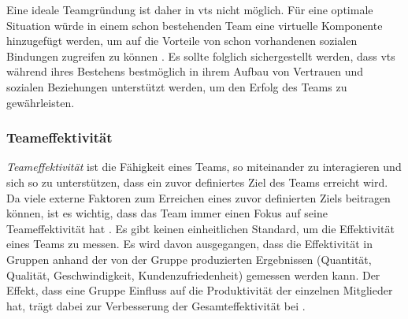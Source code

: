 \documentclass[a4paper,11pt]{article}%
\renewcommand{\\}{\vspace*{0.5\baselineskip} \newline}
\begin{document}
Eine ideale Teamgründung ist daher in \ac{vts} nicht möglich. 
Für eine optimale Situation würde in einem schon bestehenden Team eine virtuelle Komponente hinzugefügt werden, um auf die Vorteile von schon vorhandenen sozialen Bindungen zugreifen zu können \citep[p.36-37]{holton2001building}.
Es sollte folglich sichergestellt werden, dass \ac{vts} während ihres Bestehens bestmöglich in ihrem Aufbau von Vertrauen und sozialen Beziehungen unterstützt werden, um den Erfolg des Teams zu gewährleisten.
		\subsubsection{Teameffektivität}
\label{Teameffektivität}
\textit{Teameffektivität} ist die Fähigkeit eines Teams, so miteinander zu interagieren und sich so zu unterstützen, dass ein zuvor definiertes Ziel des Teams erreicht wird. Da viele externe Faktoren zum Erreichen eines zuvor definierten Ziels beitragen können, ist es wichtig, dass das Team immer einen Fokus auf seine Teameffektivität hat \citep[p.557]{salas2005there}.
	Es gibt keinen einheitlichen Standard, um die Effektivität eines Teams zu messen. Es wird davon ausgegangen, dass die Effektivität in Gruppen anhand der von der Gruppe produzierten Ergebnissen (Quantität, Qualität, Geschwindigkeit, Kundenzufriedenheit) gemessen werden kann. Der Effekt, dass eine Gruppe Einfluss auf die Produktivität der einzelnen Mitglieder hat, trägt dabei zur Verbesserung der Gesamteffektivität bei \citep[p.309]{guzzo1996teams}.
	
\end{document}
